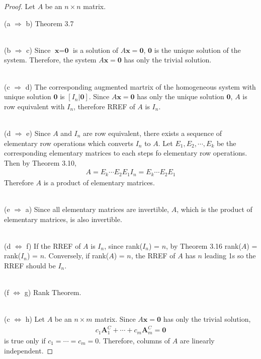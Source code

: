 \begin{proof}
	Let $A$ be an $n \times n$ matrix.
	
	\noindent (a $\Rightarrow$ b) Theorem 3.7
	
	\noindent \\ (b $\Rightarrow$ c) Since $\textbf{x} = \textbf{0}$ is a solution of $A\textbf{x} = \textbf{0}$, $\textbf{0}$ is the unique solution of the system. Therefore, the system $A\textbf{x} = \textbf{0}$ has only the trivial solution.
	
	\noindent \\ (c $\Rightarrow$ d) The corresponding augmented martrix of the homogeneous system with unique solution $\textbf{0}$ is $[I_n | \textbf{0}]$. Since $A\textbf{x}=\textbf{0}$ has only the unique solution $\textbf{0}$, $A$ is row equivalent with $I_n$, therefore RREF of $A$ is $I_n$.
	
	\noindent \\ (d $\Rightarrow$ e)
	Since $A$ and $I_n$ are row equivalent, there exists a sequence of elementary row operations which converts $I_n$ to $A$. Let $E_1, E_2, \cdots, E_k$ be the corresponding elementary matrices to each steps fo elementary row operations. Then by Theorem 3.10, \begin{align*}
	A = E_{k}\cdots E_2E_1I_n = E_{k}\cdots E_2E_1
	\end{align*} Therefore $A$ is a product of elementary matrices.
	
	\noindent \\ (e $\Rightarrow$ a)
	Since all elementary matrices are invertible, $A$, which is the product of elementary matrices, is also invertible.
	
	\noindent \\ (d $\Leftrightarrow$ f)
	If the RREF of $A$ is $I_n$, since rank($I_n$) = $n$, by Theorem 3.16 rank($A$) = rank($I_n$) = $n$. Conversely, if rank($A$) = $n$, the RREF of $A$ has $n$ leading 1s so the RREF should be $I_n$.
	
	\noindent \\ (f $\Leftrightarrow$ g)
	Rank Theorem.
	
	\noindent \\ (c $\Leftrightarrow$ h)
	Let $A$ be an $n \times m$ matrix. Since $A\textbf{x} = \textbf{0}$ has only the trivial solution,  \begin{align*}
	c_1\textbf{A}^C_1 + \cdots + c_m\textbf{A}^C_m = \textbf{0}
	\end{align*} is true only if $c_1 = \cdots = c_m = 0$. Therefore, columns of $A$ are linearly independent.
	

\end{proof}
